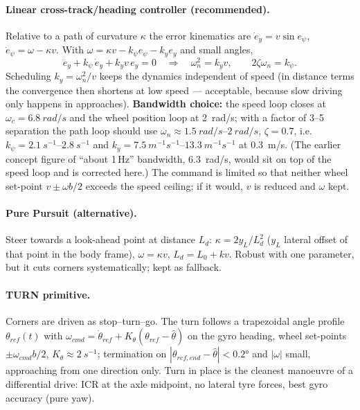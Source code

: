 \documentclass[11pt,a4paper]{article}
\begin{document}
\paragraph{Linear cross-track/heading controller (recommended).} Relative to a
path of curvature $\kappa$ the error kinematics are
$\dot e_y=v\sin e_\psi$, $\dot e_\psi=\omega-\kappa v$. With
$\omega=\kappa v-k_\psi e_\psi-k_y e_y$ and small angles,
\begin{equation}
\ddot e_y+k_\psi\,\dot e_y+k_y v\,e_y=0
\quad\Rightarrow\quad
\omega_n^2=k_y v,\qquad 2\zeta\omega_n=k_\psi .
\end{equation}
Scheduling $k_y=\omega_n^2/v$ keeps the dynamics independent of speed (in
distance terms the convergence then shortens at low speed --- acceptable, because
slow driving only happens in approaches). \textbf{Bandwidth choice:} the speed
loop closes at $\omega_c=\qty{6.8}{rad/s}$ and the wheel position loop at
\qty{2}{rad/s}; with a factor of 3--5 separation the path loop should use
$\omega_n\approx\qtyrange{1.5}{2}{rad/s}$, $\zeta=0.7$, i.e.\
$k_\psi=\qtyrange{2.1}{2.8}{s^{-1}}$ and $k_y=\qtyrange{7.5}{13.3}{m^{-1}s^{-1}}$
at \qty{0.3}{m/s}. (The earlier concept figure of ``about 1\,Hz'' bandwidth,
\qty{6.3}{rad/s}, would sit on top of the speed loop and is corrected here.) The
command is limited so that neither wheel set-point
$v\pm\omega b/2$ exceeds the speed ceiling; if it would, $v$ is reduced and
$\omega$ kept.

\paragraph{Pure Pursuit (alternative).} Steer towards a look-ahead point at
distance $L_d$: $\kappa=2y_L/L_d^2$ ($y_L$ lateral offset of that point in the
body frame), $\omega=\kappa v$, $L_d=L_0+k v$. Robust with one parameter, but it
cuts corners systematically; kept as fallback.

\paragraph{TURN primitive.} Corners are driven as stop--turn--go. The turn
follows a trapezoidal angle profile $\theta_{ref}(t)$ with
$\omega_{cmd}=\dot\theta_{ref}+K_\theta(\theta_{ref}-\hat\theta)$ on the gyro
heading, wheel set-points $\pm\omega_{cmd}b/2$, $K_\theta\approx\qty{2}{s^{-1}}$;
termination on $|\theta_{ref,end}-\hat\theta|<\ang{0.2}$ and $|\omega|$ small,
approaching from one direction only. Turn in place is the cleanest manoeuvre of a
differential drive: ICR at the axle midpoint, no lateral tyre forces, best gyro
accuracy (pure yaw).
\end{document}
